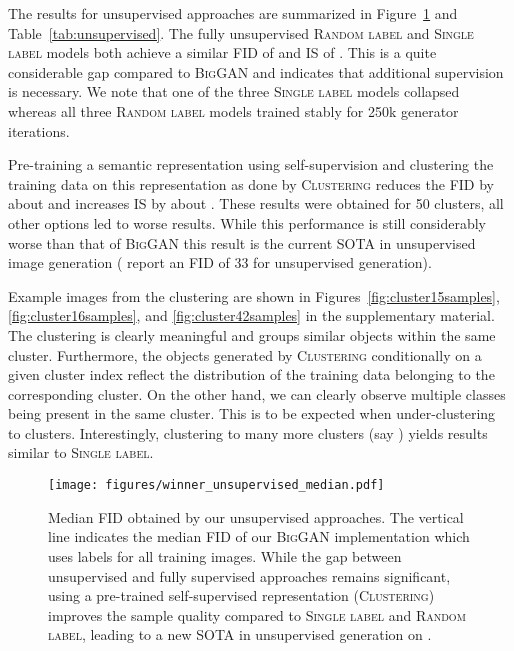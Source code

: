 \documentclass{article}
\newcommand{\tranC}{\textsc{Clustering}}
\newcommand{\slabels}{\textsc{Single label}}
\newcommand{\rlabels}{\textsc{Random label}}
\newcommand{\biggan}{\textsc{BigGAN}}
\begin{document}
The results for unsupervised approaches are summarized in Figure~\ref{fig:unsupervised} and Table~\ref{tab:unsupervised}. The fully unsupervised \rlabels{} and \slabels{} models both achieve a similar FID of  and IS of . This is a quite considerable gap compared to \biggan{} and indicates that additional supervision is necessary. We note that one of the three \slabels{} models collapsed whereas all three \rlabels{} models trained stably for 250k generator iterations.

Pre-training a semantic representation using self-supervision and clustering the training data on this representation as done by \tranC{} 
reduces the FID by about  and increases IS by about . These results were obtained for 50 clusters, all other options led to worse results. While this performance is still considerably worse than that of \biggan{} this result is the current SOTA in unsupervised image generation (\citet{chen2019self} report an FID of 33 for unsupervised generation).

Example images from the clustering are shown in Figures~\ref{fig:cluster15samples}, \ref{fig:cluster16samples}, and \ref{fig:cluster42samples} in the supplementary material. The clustering is clearly meaningful and groups similar objects within the same cluster. Furthermore, the objects generated by \tranC{} conditionally on a given cluster index reflect the distribution of the training data belonging to the corresponding cluster. On the other hand, we can clearly observe multiple classes being present in the same cluster. This is to be expected when under-clustering to  clusters. Interestingly, clustering to many more clusters (say ) yields results similar to \slabels{}.
\begin{figure}[h]
\vspace{0.2cm}
\centering\texttt{[image: figures/winner\_unsupervised\_median.pdf]}
\caption{Median FID obtained by our unsupervised approaches. The vertical line indicates the median FID of our \biggan{} implementation which uses labels for all training images. While the gap between unsupervised and fully supervised approaches remains significant, using a pre-trained self-supervised representation (\tranC{}) improves the sample quality compared to \slabels{} and \rlabels{}, leading to a new SOTA in unsupervised generation on \imagenet{}.\label{fig:unsupervised}}
\end{figure}
\end{document}
